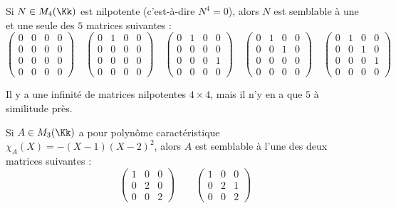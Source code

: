 \documentclass[12pt, class=report,crop=false]{standalone}
\begin{document}
\begin{exemple}
Si $N \in M_4(\Kk)$ est nilpotente (c'est-à-dire $N^4 = 0$), alors $N$ est semblable à une et une seule des $5$ matrices suivantes :
\[
\begin{pmatrix}
0&0&0&0\\
0&0&0&0\\
0&0&0&0\\
0&0&0&0
\end{pmatrix}
\quad 
\begin{pmatrix}
0&1&0&0\\
0&0&0&0\\
0&0&0&0\\
0&0&0&0
\end{pmatrix} \quad
\begin{pmatrix}
0&1&0&0\\
0&0&0&0\\
0&0&0&1\\
0&0&0&0
\end{pmatrix} \quad
\begin{pmatrix}
0&1&0&0\\
0&0&1&0\\
0&0&0&0\\
0&0&0&0
\end{pmatrix} \quad
\begin{pmatrix}
0&1&0&0\\
0&0&1&0\\
0&0&0&1\\
0&0&0&0
\end{pmatrix}
 \] 

Il y a une infinité de matrices nilpotentes $4 \times 4$, mais il n'y en a que $5$ à similitude près.

\end{exemple}

\begin{exemple}
Si $A \in M_3(\Kk)$ a pour polynôme caractéristique $ \chi_A(X) = -(X-1)(X-2)^2$, alors $A$ est semblable 
à l'une des deux matrices suivantes :
\[
\begin{pmatrix}
1&0&0\\
0&2&0\\
0&0&2
\end{pmatrix} \qquad
\begin{pmatrix}
1&0&0\\
0&2&1\\
0&0&2
\end{pmatrix}
\]
\end{exemple}
\end{document}
